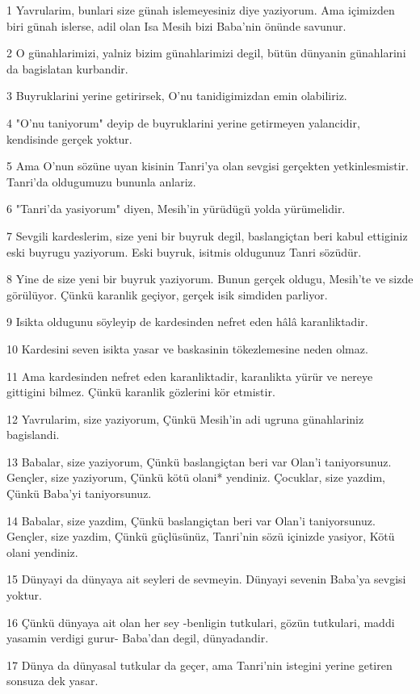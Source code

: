 \par 1 Yavrularim, bunlari size günah islemeyesiniz diye yaziyorum. Ama içimizden biri günah islerse, adil olan Isa Mesih bizi Baba'nin önünde savunur.
\par 2 O günahlarimizi, yalniz bizim günahlarimizi degil, bütün dünyanin günahlarini da bagislatan kurbandir.
\par 3 Buyruklarini yerine getirirsek, O'nu tanidigimizdan emin olabiliriz.
\par 4 "O'nu taniyorum" deyip de buyruklarini yerine getirmeyen yalancidir, kendisinde gerçek yoktur.
\par 5 Ama O'nun sözüne uyan kisinin Tanri'ya olan sevgisi gerçekten yetkinlesmistir. Tanri'da oldugumuzu bununla anlariz.
\par 6 "Tanri'da yasiyorum" diyen, Mesih'in yürüdügü yolda yürümelidir.
\par 7 Sevgili kardeslerim, size yeni bir buyruk degil, baslangiçtan beri kabul ettiginiz eski buyrugu yaziyorum. Eski buyruk, isitmis oldugunuz Tanri sözüdür.
\par 8 Yine de size yeni bir buyruk yaziyorum. Bunun gerçek oldugu, Mesih'te ve sizde görülüyor. Çünkü karanlik geçiyor, gerçek isik simdiden parliyor.
\par 9 Isikta oldugunu söyleyip de kardesinden nefret eden hâlâ karanliktadir.
\par 10 Kardesini seven isikta yasar ve baskasinin tökezlemesine neden olmaz.
\par 11 Ama kardesinden nefret eden karanliktadir, karanlikta yürür ve nereye gittigini bilmez. Çünkü karanlik gözlerini kör etmistir.
\par 12 Yavrularim, size yaziyorum, Çünkü Mesih'in adi ugruna günahlariniz bagislandi.
\par 13 Babalar, size yaziyorum, Çünkü baslangiçtan beri var Olan'i taniyorsunuz. Gençler, size yaziyorum, Çünkü kötü olani* yendiniz. Çocuklar, size yazdim, Çünkü Baba'yi taniyorsunuz.
\par 14 Babalar, size yazdim, Çünkü baslangiçtan beri var Olan'i taniyorsunuz. Gençler, size yazdim, Çünkü güçlüsünüz, Tanri'nin sözü içinizde yasiyor, Kötü olani yendiniz.
\par 15 Dünyayi da dünyaya ait seyleri de sevmeyin. Dünyayi sevenin Baba'ya sevgisi yoktur.
\par 16 Çünkü dünyaya ait olan her sey -benligin tutkulari, gözün tutkulari, maddi yasamin verdigi gurur- Baba'dan degil, dünyadandir.
\par 17 Dünya da dünyasal tutkular da geçer, ama Tanri'nin istegini yerine getiren sonsuza dek yasar.
